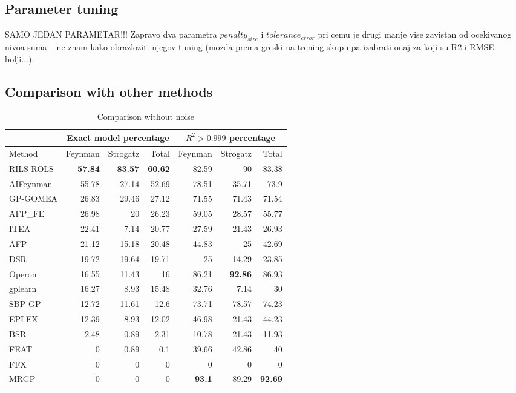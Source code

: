 \documentclass[a4paper,12pt]{elsarticle}
\begin{document}
\subsection{Parameter tuning}
SAMO JEDAN PARAMETAR!!!
Zapravo dva parametra $penalty_{size}$ i $tolerance_{error}$ pri cemu je drugi manje vise zavistan od ocekivanog 
nivoa suma -- ne znam kako obrazloziti njegov tuning (mozda prema greski na trening skupu pa izabrati onaj za koji su R2 i RMSE bolji...). 

\subsection{Comparison with other methods}

\begin{table}[!htb]
	\caption{Comparison without noise}\label{tab:comp_noise0}
	\centering
		\begin{tabular}{l|rrr|rrr} \hline
			& \multicolumn{3}{c|}{Exact model percentage} & \multicolumn{3}{c}{$R^2 > 0.999$ percentage}\\ \hline
			Method & Feynman & Strogatz & Total & Feynman & Strogatz & Total \\ \hline
			RILS-ROLS&\bf{57.84}&\bf{83.57}&\bf{60.62}&82.59&90&83.38\\
			AIFeynman&55.78&27.14&52.69&78.51&35.71&73.9\\
			GP-GOMEA&26.83&29.46&27.12&71.55&71.43&71.54\\
			AFP\_FE&26.98&20&26.23&59.05&28.57&55.77\\
			ITEA&22.41&7.14&20.77&27.59&21.43&26.93\\
			AFP&21.12&15.18&20.48&44.83&25&42.69\\
			DSR&19.72&19.64&19.71&25&14.29&23.85\\
			Operon&16.55&11.43&16&86.21&\bf{92.86}&86.93\\
			gplearn&16.27&8.93&15.48&32.76&7.14&30\\
			SBP-GP&12.72&11.61&12.6&73.71&78.57&74.23\\
			EPLEX&12.39&8.93&12.02&46.98&21.43&44.23\\
			BSR&2.48&0.89&2.31&10.78&21.43&11.93\\
			FEAT&0&0.89&0.1&39.66&42.86&40\\
			FFX&0&0&0&0&0&0\\
			MRGP&0&0&0&\bf{93.1}&89.29&\bf{92.69}\\
			\hline
		\end{tabular}
\end{table}
\end{document}
